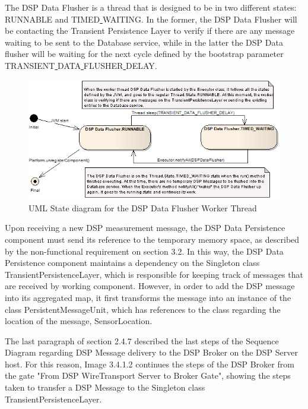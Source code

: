 The DSP Data Flusher is a thread that is designed to be in two different
states: RUNNABLE and TIMED\underline{ }WAITING. In the former, the DSP Data Flusher will be
contacting the Transient Persistence Layer to verify if there are any message
waiting to be sent to the Database service, while in the latter the DSP Data
flusher will be waiting for the next cycle defined by the bootstrap parameter
TRANSIENT\underline{ }DATA\underline{ }FLUSHER\underline{ }DELAY.


\begin{figure}[!b]
  \centering
  \includegraphics[scale=0.5]{../diagrams/DSP-DataPersistence-Flusher-State-Diagram}
  \caption{UML State diagram for the DSP Data Flusher Worker Thread}
  \label{fig:DSP-DataPersistence-Flusher-State-Diagram}
\end{figure}

Upon receiving a new DSP measurement message, the DSP Data Persistence
component must send its reference to the temporary memory space, as described
by the non-functional requirement on section 3.2. In this way, the DSP Data
Persistence component maintains a dependency on the Singleton class
TransientPersistenceLayer, which is responsible for keeping track of messages
that are received by working component. However, in order to add the DSP
message into its aggregated map, it first transforms the message into an
instance of the class PersistentMessageUnit, which has references to the class
regarding the location of the message,  SensorLocation.

The last paragraph of section 2.4.7 described the last steps of the Sequence
Diagram regarding DSP Message delivery to the DSP Broker on the DSP Server
host. For this reason, Image 3.4.1.2 continues the steps of the DSP Broker from
the gate "From DSP WireTransport Server to Broker Gate", showing the steps
taken to transfer a DSP Message to the Singleton class
TransientPersistenceLayer.

